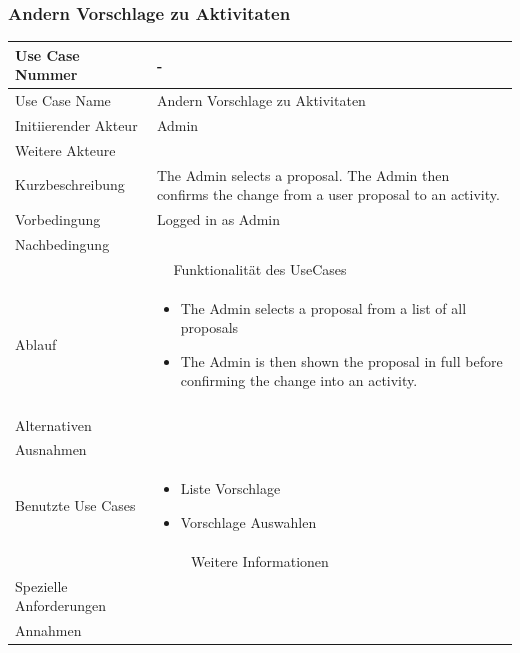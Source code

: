 \documentclass[10pt,a4paper]{article}
\begin{document}
	\subsubsection{Andern Vorschlage zu Aktivitaten}
	\begin{tabular}{|l|p{.5\linewidth}|}
	\hline Use Case Nummer & - \\ 
	\hline Use Case Name & Andern Vorschlage zu Aktivitaten \\ 
	\hline Initiierender Akteur & Admin \\
	\hline Weitere Akteure & \\
	\hline Kurzbeschreibung & The Admin selects a proposal. The Admin then confirms the change from a user proposal to an activity. \\
	\hline Vorbedingung & Logged in as Admin \\
	\hline Nachbedingung & \\
	\hline \multicolumn{2}{|c|}{Funktionalität des UseCases}\\
	\hline Ablauf & \begin{itemize}
			\item The Admin selects a proposal from a list of all proposals
			\item The Admin is then shown the proposal in full before confirming the change into an activity.
		\end{itemize} \\ \\
	\hline Alternativen &  \\
	\hline Ausnahmen & \\
	\hline Benutzte Use Cases & \begin{itemize}
			\item Liste Vorschlage
			\item Vorschlage Auswahlen
		\end{itemize} \\
	\hline \multicolumn{2}{|c|}{Weitere Informationen} \\
	\hline Spezielle Anforderungen &  \\
	\hline Annahmen &  \\
	\hline
	\end{tabular}
	
\end{document}
